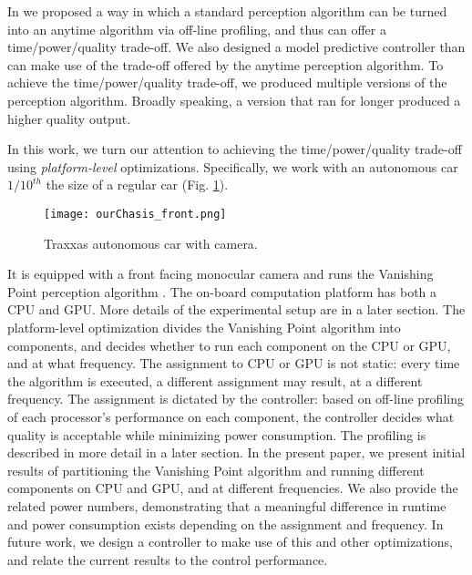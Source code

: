 In \cite{RTSS15} we proposed a way in which a standard perception algorithm can be turned into an anytime algorithm via off-line profiling, and thus can offer a time/power/quality trade-off.
We also designed a model predictive controller than can make use of the trade-off offered by the anytime perception algorithm.
To achieve the time/power/quality trade-off, we produced multiple versions of the perception algorithm.
Broadly speaking, a version that ran for longer produced a higher quality output. 

In this work, we turn our attention to achieving the time/power/quality trade-off using \emph{platform-level} optimizations.
Specifically, we work with an autonomous car $1/10^{th}$ the size of a regular car (Fig. \ref{fig:traxxas}).
\begin{figure}[t]
	\centering
	\texttt{[image: ourChasis\_front.png]}
	\caption{Traxxas autonomous car with camera.}
		\label{fig:traxxas}
\end{figure}  
It is equipped with a front facing monocular camera and runs the Vanishing Point perception algorithm \cite{VP1}. 
The on-board computation platform has both a CPU and GPU. More details of the experimental setup are in a later section.
The platform-level optimization divides the Vanishing Point algorithm into components, and decides whether to run each component on the CPU or GPU, and at what frequency.
The assignment to CPU or GPU is not static: every time the algorithm is executed, a different assignment may result, at a different frequency.
The assignment is dictated by the controller: based on off-line profiling of each processor's performance on each component, the controller decides what quality is acceptable while minimizing power consumption. The profiling is described in more detail in a later section.
In the present paper, we present initial results of partitioning the Vanishing Point algorithm and running different components on CPU and GPU, and at different frequencies.
We also provide the related power numbers, demonstrating that a meaningful difference in runtime and power consumption exists depending on the assignment and frequency.
In future work, we design a controller to make use of this and other optimizations, and relate the current results to the control performance.
%
%
%

